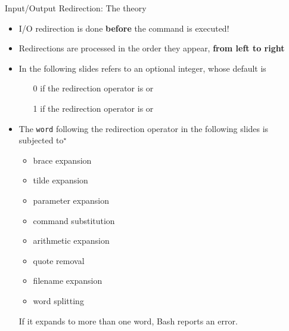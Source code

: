 \begin{frame}{Input/Output Redirection: The theory}
    \vspace{-3mm}
    \begin{itemize}
        \item I/O redirection is done \alert{\textbf{before}} the command is executed!
        \item Redirections are processed in the order they appear, \textbf{from left to right}
        \item In the following slides \PB{\texttt{[n]}} refers to an optional integer, whose default is
              \begin{itemize}
                  \item[0] if the redirection operator is \PB{\texttt{<}} or \PB{\texttt{<>}}
                  \item[1] if the redirection operator is \PB{\texttt{>}} or \PB{\texttt{>>}}
              \end{itemize}
        \item The \texttt{word} following the redirection operator in the following slides is subjected to$^\star$
              \begin{itemize}
                  \item brace expansion
                  \item tilde expansion
                  \item parameter expansion
                  \item command substitution
                  \item arithmetic expansion
                  \item quote removal
                  \item filename expansion
                  \item word splitting
              \end{itemize}
              If it expands to more than one word, Bash reports an error.
    \end{itemize}
\end{frame}
